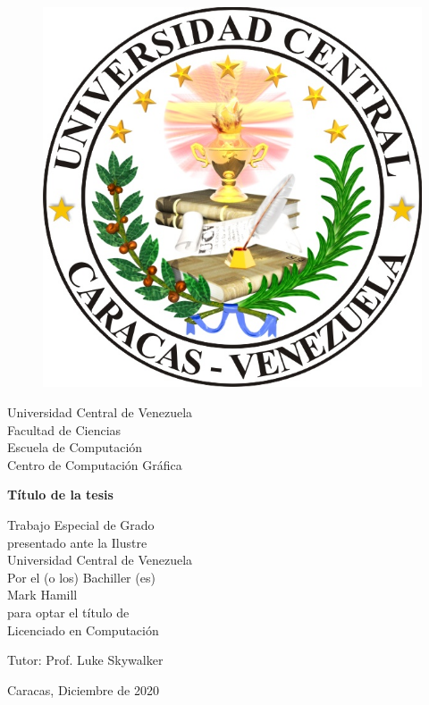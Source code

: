 \label{ch:portada}
\thispagestyle{empty}

	\begin{figure}[t]
						\centering
							\includegraphics[height=0.15\textwidth]{./images/logoUCV.jpg}
	\end{figure}
					\begin{center}
						Universidad Central de Venezuela\\
						Facultad de Ciencias\\
						Escuela de Computaci\'on\\
						Centro de Computaci\'on Gr\'afica\\
					\end{center}
					
					\vspace{2.5cm}
					\begin{center}
						\large{\textbf{T\'itulo de la tesis}}
					\end{center}
					
					\vspace{5.2cm}
					\begin{center}
						Trabajo Especial de Grado \\
						presentado ante la Ilustre\\
						Universidad Central de Venezuela\\
						Por el (o los) Bachiller (es)\\
						Mark Hamill\\
						para optar el título de \\
						Licenciado en Computaci\'on
					\end{center}
					
					\begin{center}
						Tutor: Prof. Luke Skywalker\\
					\end{center}
					
					\vspace{1.0cm}
					\begin{center}
						Caracas, Diciembre de 2020
					\end{center}
						
					
